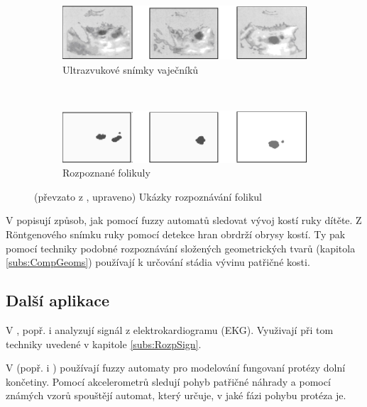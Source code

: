 \documentclass[a4paper,10pt]{article}
\begin{document}
\begin{figure}
  \begin{subfigure}[t]{\textwidth}
    \includegraphics[width=\textwidth]{genimg-follicles-1}
    \caption{Ultrazvukové snímky vaječníků} \label{img:Follicles:Screens}
  \end{subfigure}
  \\
  \begin{subfigure}[t]{\textwidth}
    \includegraphics[width=\textwidth]{genimg-follicles-2}
    \caption{Rozpoznané folikuly}
  \end{subfigure}
 
  \caption{(převzato z \cite{WanJiaZhoDu-ImProcBasFuzCelAuMod}, upraveno) Ukázky rozpoznávání folikul} \label{img:Follicles}
\end{figure}

V \cite{PatPal-FuzGraSynRecSkeMatXra} popisují způsob, jak pomocí fuzzy automatů sledovat vývoj kostí ruky dítěte. Z Röntgenového snímku ruky pomocí detekce hran obrdrží obrysy kostí. Ty pak pomocí techniky podobné rozpoznávání složených geometrických tvarů (kapitola \ref{subs:CompGeoms}) používají k určování stádia vývinu patřičné kosti.

\subsection{Další aplikace} \label{subs:BioMedRest}
V \cite{PedGac-LeaFuzzAut}, popř. i \cite{RigTza-FuzAutFauDia} analyzují signál z elektrokardiogramu (EKG). Využivají při tom techniky uvedené v kapitole \ref{subs:RozpSign}.

V \cite{Alv-HumGaiModUsGenFuzFinStaMac} (popř. i \cite{AlvTri-ComModQuaPerSig})
používají fuzzy automaty pro modelování fungovaní protézy dolní končetiny. Pomocí akcelerometrů sledují pohyb patřičné náhrady a pomocí známých vzorů spouštějí automat, který určuje, v jaké fázi pohybu protéza je.
\end{document}
